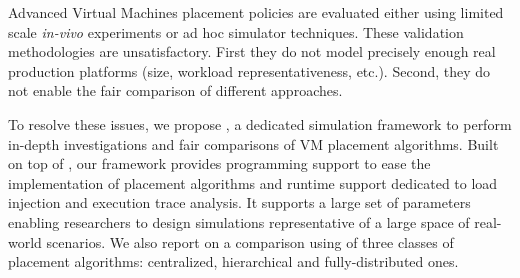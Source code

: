 

Advanced Virtual Machines placement policies are evaluated either
using limited scale \emph{in-vivo} experiments or ad hoc simulator
techniques. These validation methodologies are unsatisfactory. First
they do not model precisely enough real production platforms (size,
workload representativeness, etc.). Second, they do not enable the
fair comparison of different approaches. 

To resolve these issues, we propose \vmps, a dedicated simulation
framework to perform in-depth investigations and fair comparisons of
VM placement algorithms. Built on top of \sg,
our framework provides programming support to ease the implementation
of placement algorithms and runtime support dedicated to load
injection and execution trace analysis.  It supports a large set of
parameters enabling researchers to design simulations representative
of a large space of real-world scenarios.
We also report on a comparison using \vmps of three classes of
placement algorithms: centralized, hierarchical and fully-distributed
ones.



